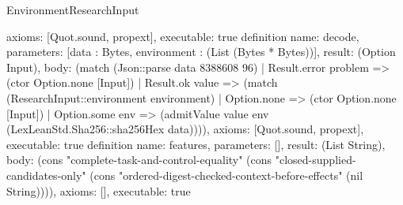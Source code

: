 \begin{lexlean}{EnvironmentResearchInput}
\begin{semanticmodule}
{ axioms: [Quot.sound, propext], executable: true
}
definition{
 name: decode, parameters: [data : Bytes, environment : (List (Bytes * Bytes))], result: (Option Input),
 body: (match (Json::parse data 8388608 96) | Result.error problem => (ctor Option.none [Input]) | Result.ok value => (match (ResearchInput::environment environment) | Option.none => (ctor Option.none [Input]) | Option.some env => (admitValue value env (LexLeanStd.Sha256::sha256Hex data)))),
 axioms: [Quot.sound, propext], executable: true
}
definition{
 name: features, parameters: [], result: (List String),
 body: (cons "complete-task-and-control-equality" (cons "closed-supplied-candidates-only" (cons "ordered-digest-checked-context-before-effects" (nil String)))),
 axioms: [], executable: true
}
\end{semanticmodule}
\end{lexlean}
